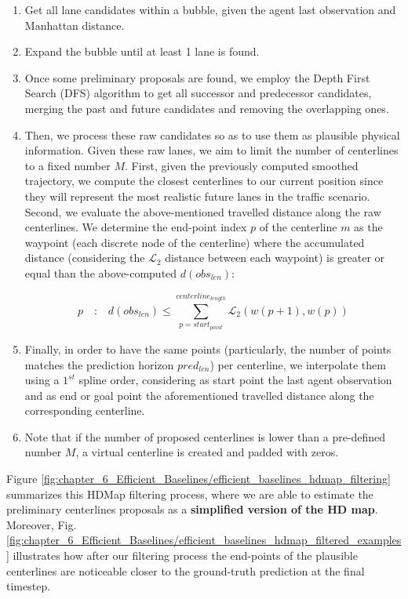 \begin{enumerate}
	\item Get all lane candidates within a bubble, given the agent last observation and Manhattan distance.
	
	\item Expand the bubble until at least 1 lane is found.
	
	\item Once some preliminary proposals are found, we employ the Depth First Search (DFS) algorithm to get all successor and predecessor candidates, merging the past and future candidates and removing the overlapping ones.
	
	\item Then, we process these raw candidates so as to use them as plausible physical information. Given these raw lanes, we aim to limit the number of centerlines to a fixed number $M$. First, given the previously computed smoothed trajectory, we compute the closest centerlines to our current position since they will represent the most realistic future lanes in the traffic scenario. Second, we evaluate the above-mentioned travelled distance along the raw centerlines. We determine the end-point index $p$ of the centerline $m$ as the waypoint (each discrete node of the centerline) where the accumulated distance (considering the $\mathcal{L}_2$ distance between each waypoint) is greater or equal than the above-computed $d(obs_{len})$:
	
	\begin{equation}
		p \quad \textbf{:} \quad d(obs_{len}) \leq \sum_{p=start_{point}}^{centerline_{length}} \mathcal{L}_2(w(p+1),w(p))
	\end{equation}
	
	\item Finally, in order to have the same points (particularly, the number of points matches the prediction horizon $pred_{len}$) per centerline, we interpolate them using a $1^{st}$ spline order, considering as start point the last agent observation and as end or goal point the aforementioned travelled distance along the corresponding centerline.
	
	\item Note that if the number of proposed centerlines is lower than a pre-defined number $M$, a virtual centerline is created and padded with zeros.
\end{enumerate}

Figure \ref{fig:chapter_6_Efficient_Baselines/efficient_baselines_hdmap_filtering} summarizes this HDMap filtering process, where we are able to estimate the preliminary centerlines proposals as a \textbf{simplified version of the HD map}. Moreover, Fig. \ref{fig:chapter_6_Efficient_Baselines/efficient_baselines_hdmap_filtered_examples} illustrates how after our filtering process the end-points of the plausible centerlines are noticeable closer to the ground-truth prediction at the final timestep. 

